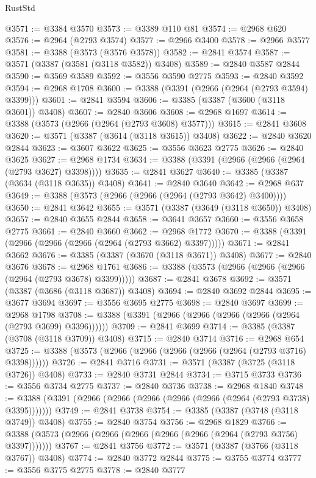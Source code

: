 \begin{lexlean}{RustStd}
\begin{coremodule}
{\begin{coremodule}
{{{{{{{{{{{{{{{{{{{{{{{{{{{{{{{{{@3571 := @3384 @3570
@3573 := @3389 @110 @81
@3574 := @2968 @620
@3576 := @2964 (@2793 @3574)
@3577 := @2966 @3400
@3578 := @2966 @3577
@3581 := @3388 (@3573 (@3576 @3578))
@3582 := @2841 @3574
@3587 := @3571 (@3387 (@3581 (@3118 @3582)) @3408)
@3589 := @2840 @3587 @2844
@3590 := @3569 @3589
@3592 := @3556 @3590 @2775
@3593 := @2840 @3592
@3594 := @2968 @1708
@3600 := @3388 (@3391 (@2966 (@2964 (@2793 @3594) @3399)))
@3601 := @2841 @3594
@3606 := @3385 (@3387 (@3600 (@3118 @3601)) @3408)
@3607 := @2840 @3606
@3608 := @2968 @1697
@3614 := @3388 (@3573 (@2966 (@2964 (@2793 @3608) @3577)))
@3615 := @2841 @3608
@3620 := @3571 (@3387 (@3614 (@3118 @3615)) @3408)
@3622 := @2840 @3620 @2844
@3623 := @3607 @3622
@3625 := @3556 @3623 @2775
@3626 := @2840 @3625
@3627 := @2968 @1734
@3634 := @3388 (@3391 (@2966 (@2966 (@2964 (@2793 @3627) @3398))))
@3635 := @2841 @3627
@3640 := @3385 (@3387 (@3634 (@3118 @3635)) @3408)
@3641 := @2840 @3640
@3642 := @2968 @637
@3649 := @3388 (@3573 (@2966 (@2966 (@2964 (@2793 @3642) @3400))))
@3650 := @2841 @3642
@3655 := @3571 (@3387 (@3649 (@3118 @3650)) @3408)
@3657 := @2840 @3655 @2844
@3658 := @3641 @3657
@3660 := @3556 @3658 @2775
@3661 := @2840 @3660
@3662 := @2968 @1772
@3670 := @3388 (@3391 (@2966 (@2966 (@2966 (@2964 (@2793 @3662) @3397)))))
@3671 := @2841 @3662
@3676 := @3385 (@3387 (@3670 (@3118 @3671)) @3408)
@3677 := @2840 @3676
@3678 := @2968 @1761
@3686 := @3388 (@3573 (@2966 (@2966 (@2966 (@2964 (@2793 @3678) @3399)))))
@3687 := @2841 @3678
@3692 := @3571 (@3387 (@3686 (@3118 @3687)) @3408)
@3694 := @2840 @3692 @2844
@3695 := @3677 @3694
@3697 := @3556 @3695 @2775
@3698 := @2840 @3697
@3699 := @2968 @1798
@3708 := @3388 (@3391 (@2966 (@2966 (@2966 (@2966 (@2964 (@2793 @3699) @3396))))))
@3709 := @2841 @3699
@3714 := @3385 (@3387 (@3708 (@3118 @3709)) @3408)
@3715 := @2840 @3714
@3716 := @2968 @654
@3725 := @3388 (@3573 (@2966 (@2966 (@2966 (@2966 (@2964 (@2793 @3716) @3398))))))
@3726 := @2841 @3716
@3731 := @3571 (@3387 (@3725 (@3118 @3726)) @3408)
@3733 := @2840 @3731 @2844
@3734 := @3715 @3733
@3736 := @3556 @3734 @2775
@3737 := @2840 @3736
@3738 := @2968 @1840
@3748 := @3388 (@3391 (@2966 (@2966 (@2966 (@2966 (@2966 (@2964 (@2793 @3738) @3395)))))))
@3749 := @2841 @3738
@3754 := @3385 (@3387 (@3748 (@3118 @3749)) @3408)
@3755 := @2840 @3754
@3756 := @2968 @1829
@3766 := @3388 (@3573 (@2966 (@2966 (@2966 (@2966 (@2966 (@2964 (@2793 @3756) @3397)))))))
@3767 := @2841 @3756
@3772 := @3571 (@3387 (@3766 (@3118 @3767)) @3408)
@3774 := @2840 @3772 @2844
@3775 := @3755 @3774
@3777 := @3556 @3775 @2775
@3778 := @2840 @3777
}}}}}}}}}}}}}}}}}}}}}}}}}}}}}}}}}
\end{coremodule}}
\end{coremodule}
\end{lexlean}
